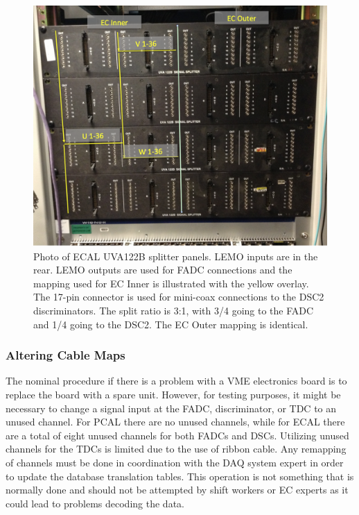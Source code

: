 \documentclass[letterpaper,10pt]{article}
\begin{document}
\begin{figure}[htbp]
\vspace{2mm}
  \centering
  \includegraphics[width= 7in, keepaspectratio = true]{ecal-pp-2.png}
\caption{Photo of ECAL UVA122B splitter panels.  LEMO inputs are in the rear.  LEMO outputs are used
  for FADC connections and the mapping used for EC Inner is illustrated with the yellow overlay.  The 17-pin connector
  is used for mini-coax connections to the DSC2 discriminators.  The split ratio is 3:1, with 3/4 going
  to the FADC and 1/4 going to the DSC2.  The EC Outer mapping is identical.}
\label{ecal-pp-2}
\end{figure}

\subsubsection{Altering Cable Maps}

The nominal procedure if there is a problem with a VME electronics board is to replace the board
with a spare unit.  However, for testing purposes, it might be necessary to change a signal input
at the FADC, discriminator, or TDC to an unused channel. For PCAL there are no unused channels,
while for ECAL there are a total of eight unused channels for both FADCs and DSCs.  Utilizing
unused channels for the TDCs is limited due to the use of ribbon cable.  Any remapping of channels
must be done in coordination with the DAQ system expert in order to update the database translation 
tables. This operation is not something that is normally done and should not be attempted by shift
workers or EC experts as it could lead to problems decoding the data.
\end{document}
